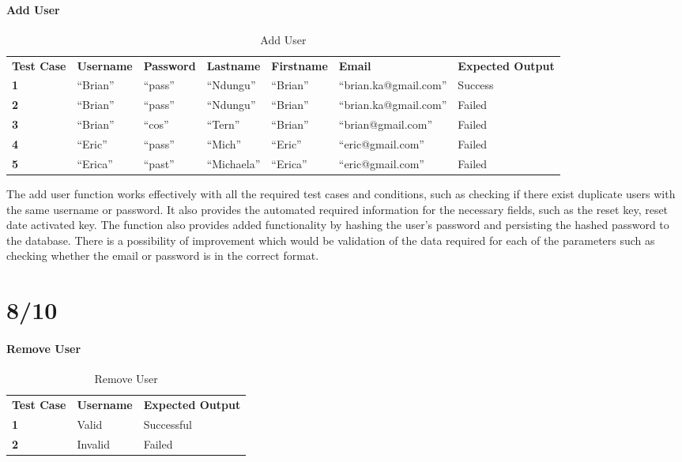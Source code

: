   \subsection{Add User}
\begin{table}[]
\centering
\caption{Add User}
\begin{tabular}{@{}lllllll@{}}
\textbf{Test Case} & \textbf{Username} & \textbf{Password} & \textbf{Lastname} & \textbf{Firstname} & \textbf{Email}       & \textbf{Expected Output} \\
\textbf{1}         & “Brian”           & “pass”            & “Ndungu”          & “Brian”            & “brian.ka@gmail.com” & Success                  \\
\textbf{2}         & “Brian”           & “pass”            & “Ndungu”          & “Brian”            & “brian.ka@gmail.com” & Failed                   \\
\textbf{3}         & “Brian”           & “cos”             & “Tern”            & “Brian”            & “brian@gmail.com”    & Failed                   \\
\textbf{4}         & “Eric”            & “pass”            & “Mich”            & “Eric”             & “eric@gmail.com”     & Failed                   \\
\textbf{5}         & “Erica”           & “past”            & “Michaela”        & “Erica”            & “eric@gmail.com”     & Failed                  
\end{tabular}
\end{table}
The add user function works effectively with all the required test cases and conditions, such as checking if there exist duplicate users with the same username or password. It also provides the automated required information for the necessary fields, such as the reset key, reset date activated key. The function also provides added functionality by hashing the user’s password and persisting the hashed password to the database. There is a possibility of improvement which would be validation of the data required for each of the parameters such as checking whether the email or password is in the correct format.
\part*{8/10}
  \subsection{Remove User}
  \begin{table}[]
\centering
\caption{Remove User}
\begin{tabular}{@{}lll@{}}
\textbf{Test Case} & \textbf{Username} & \textbf{Expected Output} \\
\textbf{1}         & Valid             & Successful               \\
\textbf{2}         & Invalid           & Failed                  
\end{tabular}
\end{table}

